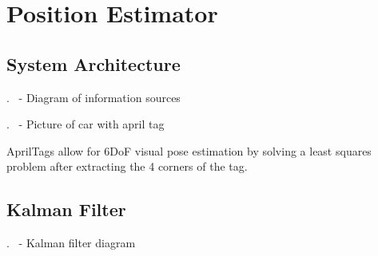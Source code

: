 \section{Position Estimator}

\subsection{System Architecture}
\begin{frame}{\thesection. \insertsection \ - \insertsubsection}
	Diagram of information sources
\end{frame}


\begin{frame}{\thesection. \insertsection \ - \insertsubsection}
	Picture of car with april tag
	
	AprilTags allow for 6DoF visual pose estimation by solving a least squares problem
	after extracting the 4 corners of the tag.
\end{frame}


\subsection{Kalman Filter}
\begin{frame}{\thesection. \insertsection \ - \insertsubsection}
	Kalman filter diagram
\end{frame}

